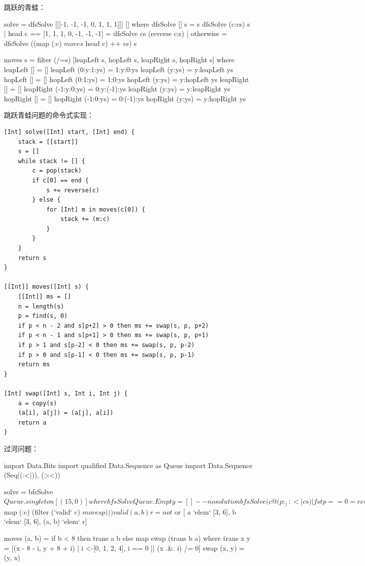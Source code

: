 \documentclass[b5paper]{ctexart}
\begin{document}
跳跃的青蛙：

\begin{Haskell}
solve = dfsSolve [[[-1, -1, -1, 0, 1, 1, 1]]] [] where
    dfsSolve [] s = s
    dfsSolve (c:cs) s
             | head c == [1, 1, 1, 0, -1, -1, -1] = dfsSolve cs (reverse c:s)
             | otherwise = dfsSolve ((map (:c) $ moves $ head c) ++ cs) s

moves s = filter (/=s) [leapLeft s, hopLeft s, leapRight s, hopRight s] where
    leapLeft [] = []
    leapLeft (0:y:1:ys) = 1:y:0:ys
    leapLeft (y:ys) = y:leapLeft ys
    hopLeft [] = []
    hopLeft (0:1:ys) = 1:0:ys
    hopLeft (y:ys) = y:hopLeft ys
    leapRight [] = []
    leapRight (-1:y:0:ys) = 0:y:(-1):ys
    leapRight (y:ys) = y:leapRight ys
    hopRight [] = []
    hopRight (-1:0:ys) = 0:(-1):ys
    hopRight (y:ys) = y:hopRight ys
\end{Haskell}

跳跃青蛙问题的命令式实现：

\begin{lstlisting}[language = Bourbaki]
[Int] solve([Int] start, [Int] end) {
    stack = [[start]]
    s = []
    while stack != [] {
        c = pop(stack)
        if c[0] == end {
            s += reverse(c)
        } else {
            for [Int] m in moves(c[0]) {
                stack += (m:c)
            }
        }
    }
    return s
}

[[Int]] moves([Int] s) {
    [[Int]] ms = []
    n = length(s)
    p = find(s, 0)
    if p < n - 2 and s[p+2] > 0 then ms += swap(s, p, p+2)
    if p < n - 1 and s[p+1] > 0 then ms += swap(s, p, p+1)
    if p > 1 and s[p-2] < 0 then ms += swap(s, p, p-2)
    if p > 0 and s[p-1] < 0 then ms += swap(s, p, p-1)
    return ms
}

[Int] swap([Int] s, Int i, Int j) {
    a = copy(s)
    (a[i], a[j]) = (a[j], a[i])
    return a
}
\end{lstlisting}

过河问题：

\begin{Haskell}
import Data.Bits
import qualified Data.Sequence as Queue
import Data.Sequence (Seq((:<|)), (><))

solve = bfsSolve $ Queue.singleton [(15, 0)] where
  bfsSolve Queue.Empty = [] -- no solution
  bfsSolve (c@(p:_) :<| cs)
    | fst p == 0 = reverse c
    | otherwise = bfsSolve (cs >< (Queue.fromList $ map (:c)
                                    (filter (`valid` c) $ moves p)))

valid (a, b) r = not $ or [ a `elem` [3, 6], b `elem` [3, 6], (a, b) `elem` r]

moves (a, b) = if b < 8 then trans a b else map swap (trans b a) where
    trans x y = [(x - 8 - i, y + 8 + i)
                     | i <-[0, 1, 2, 4], i == 0 || (x .&. i) /= 0]
    swap (x, y) = (y, x)
\end{Haskell}
\end{document}
